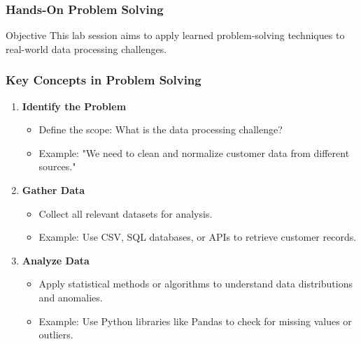 \documentclass[aspectratio=169]{beamer}
\begin{document}
\begin{frame}
    \frametitle{Hands-On Problem Solving}
    \begin{block}{Objective}
        This lab session aims to apply learned problem-solving techniques to real-world data processing challenges.
    \end{block}
\end{frame}

\begin{frame}
    \frametitle{Key Concepts in Problem Solving}
    \begin{enumerate}
        \item \textbf{Identify the Problem}
            \begin{itemize}
                \item Define the scope: What is the data processing challenge? 
                \item Example: "We need to clean and normalize customer data from different sources."
            \end{itemize}
        
        \item \textbf{Gather Data}
            \begin{itemize}
                \item Collect all relevant datasets for analysis.
                \item Example: Use CSV, SQL databases, or APIs to retrieve customer records.
            \end{itemize}

        \item \textbf{Analyze Data}
            \begin{itemize}
                \item Apply statistical methods or algorithms to understand data distributions and anomalies.
                \item Example: Use Python libraries like Pandas to check for missing values or outliers.
            \end{itemize}
    \end{enumerate}
\end{frame}
\end{document}
